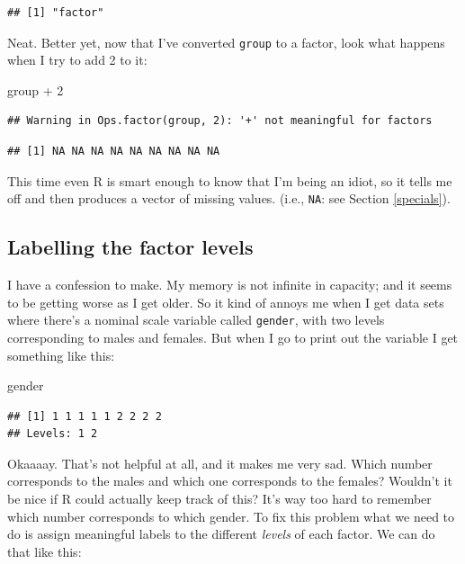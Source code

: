 \documentclass[
]{book}
\newenvironment{Shaded}{\begin{snugshade}}{\end{snugshade}}
\newcommand{\DecValTok}[1]{\textcolor[rgb]{0.00,0.00,0.81}{#1}}
\newcommand{\NormalTok}[1]{#1}
\newcommand{\SpecialCharTok}[1]{\textcolor[rgb]{0.00,0.00,0.00}{#1}}
\begin{document}
\begin{verbatim}
## [1] "factor"
\end{verbatim}

Neat. Better yet, now that I've converted \texttt{group} to a factor, look what happens when I try to add 2 to it:

\begin{Shaded}
\begin{Highlighting}[]
\NormalTok{group }\SpecialCharTok{+} \DecValTok{2}
\end{Highlighting}
\end{Shaded}

\begin{verbatim}
## Warning in Ops.factor(group, 2): '+' not meaningful for factors
\end{verbatim}

\begin{verbatim}
## [1] NA NA NA NA NA NA NA NA NA
\end{verbatim}

This time even R is smart enough to know that I'm being an idiot, so it tells me off and then produces a vector of missing values. (i.e., \texttt{NA}: see Section \ref{specials}).

\hypertarget{labelling-the-factor-levels}{%
\subsection{Labelling the factor levels}\label{labelling-the-factor-levels}}

I have a confession to make. My memory is not infinite in capacity; and it seems to be getting worse as I get older. So it kind of annoys me when I get data sets where there's a nominal scale variable called \texttt{gender}, with two levels corresponding to males and females. But when I go to print out the variable I get something like this:

\begin{Shaded}
\begin{Highlighting}[]
\NormalTok{gender}
\end{Highlighting}
\end{Shaded}

\begin{verbatim}
## [1] 1 1 1 1 1 2 2 2 2
## Levels: 1 2
\end{verbatim}

Okaaaay. That's not helpful at all, and it makes me very sad. Which number corresponds to the males and which one corresponds to the females? Wouldn't it be nice if R could actually keep track of this? It's way too hard to remember which number corresponds to which gender. To fix this problem what we need to do is assign meaningful labels to the different \emph{levels} of each factor. We can do that like this:
\end{document}
